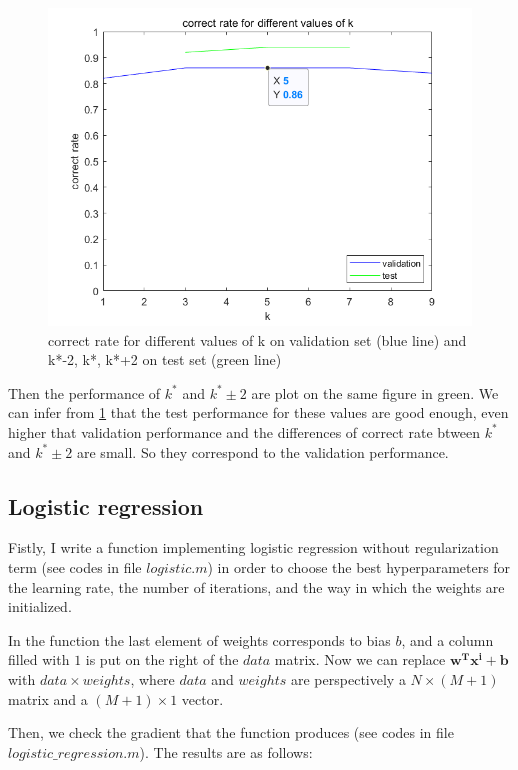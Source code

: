 \documentclass{article}
\begin{document}
\begin{figure}
	\centering
	\includegraphics[scale=0.65]{figure1}
	\caption{correct rate for different values of k on validation set (blue line) and k*-2, k*, k*+2 on test set (green line)}
	\label{fig1}
\end{figure}

Then the performance of $k^*$ and $k^*\pm2$ are plot on the same figure in green. We can infer from \ref{fig1} that the test performance for these values are good enough, even higher that validation performance and the differences of correct rate btween $k^*$ and $k^*\pm2$ are small. So they correspond to the validation performance.
  
\subsection{Logistic regression}
Fistly, I write a function implementing logistic regression without regularization term (see codes in file $logistic.m$) in order to choose the best hyperparameters for the learning rate, the number of iterations, and the way in which
the weights are initialized.\par
In the function the last element of weights corresponds to bias $b$, and a column filled with $1$ is put on the right of the $data$ matrix. Now we can replace $\bm{w^Tx^{i}+b}$ with $data\times{weights}$, where $data$ and $weights$ are perspectively a $N\times(M+1)$ matrix and a $(M+1)\times1$ vector.\par
Then, we check the gradient that the function produces (see codes in file $logistic\_regression.m$). The results are as follows:
\end{document}
